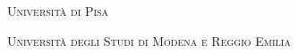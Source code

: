 \documentclass[a4paper,twoside,openright]{book}
\theoremstyle{plain}
\theoremstyle{definition}
\begin{document}
\begin{titlepage}
    \vspace{1.8cm}

    {\Large \textsc{Università di Pisa}\par}
    \vspace{0.3cm}

 { %
    {\Large \textsc{Università degli Studi di Modena e Reggio Emilia}\par}
} %
     

\end{titlepage}
\end{document}
